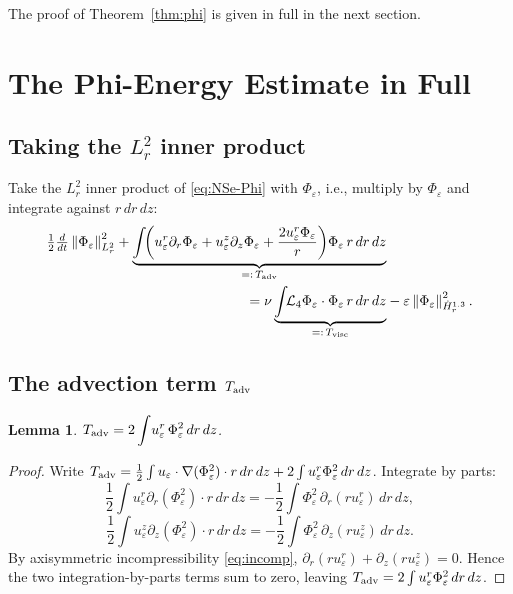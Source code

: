 \documentclass{article}
\newtheorem{lemma}[theorem]{Lemma}
\theoremstyle{definition}
\theoremstyle{remark}
\newcommand{\e}{\varepsilon}
\newcommand{\half}{\tfrac{1}{2}}
\newcommand{\Lc}{\mathcal{L}}
\newcommand{\norm}[1]{\left\|#1\right\|}
\newcommand{\ddt}{\tfrac{d}{dt}}
\begin{document}
The proof of Theorem~\ref{thm:phi} is given in full in the next section.

\section{The Phi-Energy Estimate in Full}\label{sec:phienergy}

\subsection{Taking the \texorpdfstring{$L^2_r$}{L2r} inner product}

Take the $L^2_r$ inner product of \eqref{eq:NSe-Phi} with $\Phi_\e$,
i.e., multiply by $\Phi_\e$ and integrate against $r\,dr\,dz$:
\begin{align}
  \half\ddt\norm{\Phi_\e}_{L^2_r}^2
  + \underbrace{\int\!\!\left(u_\e^r\partial_r\Phi_\e
    + u_\e^z\partial_z\Phi_\e
    + \frac{2u_\e^r\Phi_\e}{r}\right)\!\Phi_\e\,r\,dr\,dz}_{=:\,T_{\rm adv}}
  &\nonumber\\
  = \nu\underbrace{\int\!\!\Lc_4\Phi_\e\cdot\Phi_\e\,r\,dr\,dz}_{=:\,T_{\rm visc}}
  &- \e\norm{\Phi_\e}_{\dot H^{1.3}_r}^2.
  \label{eq:Phienergy}
\end{align}

\subsection{The advection term \texorpdfstring{$T_{\rm adv}$}{T-adv}}

\begin{lemma}\label{lem:Tadv}
  $T_{\rm adv} = 2\displaystyle\int\! u_\e^r\,\Phi_\e^2\,dr\,dz$.
\end{lemma}
\begin{proof}
  Write $T_{\rm adv} = \frac{1}{2}\int u_\e\cdot\nabla(\Phi_\e^2)
  \cdot r\,dr\,dz + 2\int u_\e^r\Phi_\e^2\,dr\,dz$.
  Integrate by parts:
  \[
    \frac{1}{2}\int u_\e^r\partial_r(\Phi_\e^2)\cdot r\,dr\,dz
    = -\frac{1}{2}\int\Phi_\e^2\,\partial_r(r u_\e^r)\,dr\,dz,
  \]
  \[
    \frac{1}{2}\int u_\e^z\partial_z(\Phi_\e^2)\cdot r\,dr\,dz
    = -\frac{1}{2}\int\Phi_\e^2\,\partial_z(r u_\e^z)\,dr\,dz.
  \]
  By axisymmetric incompressibility \eqref{eq:incomp},
  $\partial_r(r u_\e^r) + \partial_z(r u_\e^z) = 0$.  Hence the two
  integration-by-parts terms sum to zero, leaving
  $T_{\rm adv} = 2\int u_\e^r\Phi_\e^2\,dr\,dz$.
\end{proof}
\end{document}
